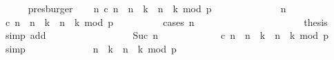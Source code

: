 \begin{isabellebody}
\ \ \ \ \isamarkupfalse%
\ presburger\isanewline
\ \ \isamarkupfalse%
\ {\isacartoucheopen}{\isasymforall}n{\isachardot}\ {\isacharparenleft}{\isachardollar}c{\isacharparenright}\ n\ {\isacharequal}\ {\isacharparenleft}{\isacharparenleft}n\ {\isasymge}\ k{\isacharplus}{}{\isacharparenright}\ {\isasymand}\ {\isacharparenleft}{\isacharparenleft}n\ {\isacharminus}\ {\isacharparenleft}k{\isacharplus}{}{\isacharparenright}{\isacharparenright}\ mod\ p\ {\isacharequal}\ {}{\isacharparenright}{\isacharparenright}{\isacartoucheclose}\isanewline
\ \ \isamarkupfalse%
\ {\isacharminus}\isanewline
\ \ \ \ \isacommand{{\isacharbraceleft}}\isamarkupfalse%
\ \isamarkupfalse%
\ n\isanewline
\ \ \ \ \ \ \isamarkupfalse%
\ {\isacartoucheopen}{\isacharparenleft}{\isachardollar}c{\isacharparenright}\ n\ {\isacharequal}\ {\isacharparenleft}{\isacharparenleft}n\ {\isasymge}\ k{\isacharplus}{}{\isacharparenright}\ {\isasymand}\ {\isacharparenleft}{\isacharparenleft}n\ {\isacharminus}\ {\isacharparenleft}k{\isacharplus}{}{\isacharparenright}{\isacharparenright}\ mod\ p\ {\isacharequal}\ {}{\isacharparenright}{\isacharparenright}{\isacartoucheclose}\isanewline
\ \ \ \ \ \ \isamarkupfalse%
\ {\isacharparenleft}cases\ n{\isacharparenright}\isanewline
\ \ \ \ \ \ \ \ \isamarkupfalse%
\ {}\isanewline
\ \ \ \ \ \ \ \ \ \ \isamarkupfalse%
\ {\isacharquery}thesis\ \isamarkupfalse%
\ {\isacharparenleft}simp\ add{\isacharcolon}\ {\isachardoublequoteopen}{}{\isachardoublequoteclose}{\isacharparenright}\isanewline
\ \ \ \ \ \ \isamarkupfalse%
\isanewline
\ \ \ \ \ \ \ \ \isamarkupfalse%
\ {\isacharparenleft}Suc\ n{\isacharprime}{\isacharparenright}\isanewline
\ \ \ \ \ \ \ \ \isamarkupfalse%
\ {}\ \isamarkupfalse%
\ {\isacartoucheopen}{\isacharparenleft}{\isachardollar}c{\isacharparenright}\ n\ {\isacharequal}\ {\isacharparenleft}{\isacharparenleft}n{\isacharprime}\ {\isasymge}\ k{\isacharparenright}\ {\isasymand}\ {\isacharparenleft}{\isacharparenleft}n{\isacharprime}\ {\isacharminus}\ k{\isacharparenright}\ mod\ p\ {\isacharequal}\ {}{\isacharparenright}{\isacharparenright}{\isacartoucheclose}\ \isamarkupfalse%
\ simp\isanewline
\ \ \ \ \ \ \ \ \isamarkupfalse%
\ \isamarkupfalse%
\ {\isacartoucheopen}{\isachardot}{\isachardot}{\isachardot}\ {\isacharequal}\ {\isacharparenleft}{\isacharparenleft}n{\isacharminus}{}\ {\isasymge}\ k{\isacharparenright}\ {\isasymand}\ {\isacharparenleft}{\isacharparenleft}n{\isacharminus}{}\ {\isacharminus}\ k{\isacharparenright}\ mod\ p\ {\isacharequal}\ {}{\isacharparenright}{\isacharparenright}{\isacartoucheclose}\ \isamarkupfalse%

\end{isabellebody}

